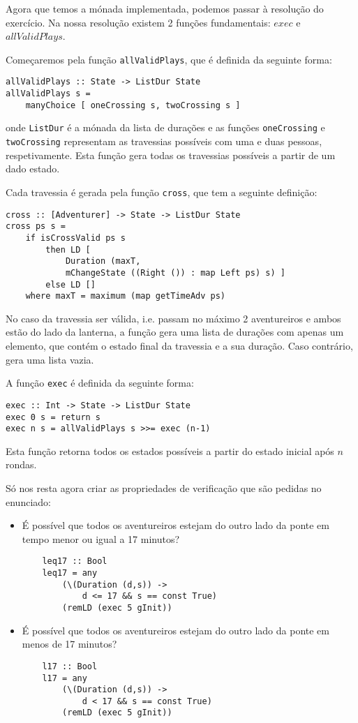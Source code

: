 \documentclass[12pt]{extarticle}
\begin{document}
Agora que temos a mónada implementada, podemos passar à resolução do exercício.
Na nossa resolução existem 2 funções fundamentais: $exec$ e $allValidPlays$.

Começaremos pela função \texttt{allValidPlays}, que é definida da seguinte forma:
\begin{lstlisting}
allValidPlays :: State -> ListDur State
allValidPlays s = 
    manyChoice [ oneCrossing s, twoCrossing s ]
\end{lstlisting}

onde \texttt{ListDur} é a mónada da lista de durações e as funções \texttt{oneCrossing} e \texttt{twoCrossing} representam as travessias possíveis com uma e duas pessoas, respetivamente.
Esta função gera todas os travessias possíveis a partir de um dado estado.

Cada travessia é gerada pela função \texttt{cross}, que tem a seguinte definição:
\begin{lstlisting}
cross :: [Adventurer] -> State -> ListDur State
cross ps s = 
    if isCrossValid ps s 
        then LD [ 
            Duration (maxT, 
            mChangeState ((Right ()) : map Left ps) s) ]
        else LD []
    where maxT = maximum (map getTimeAdv ps)
\end{lstlisting}
No caso da travessia ser válida, i.e. passam no máximo 2 aventureiros e ambos estão do lado da lanterna, a função gera uma lista de durações com apenas um elemento, que contém o estado final da travessia e a sua duração.
Caso contrário, gera uma lista vazia.


A função \texttt{exec} é definida da seguinte forma:
\begin{lstlisting}
exec :: Int -> State -> ListDur State
exec 0 s = return s
exec n s = allValidPlays s >>= exec (n-1)
\end{lstlisting}

Esta função retorna todos os estados possíveis a partir do estado inicial após $n$ rondas.

Só nos resta agora criar as propriedades de verificação que são pedidas no enunciado:
\begin{itemize}
    \item É possível que todos os aventureiros estejam do outro lado da ponte em tempo menor ou igual a 17 minutos?
    \begin{lstlisting}
    leq17 :: Bool
    leq17 = any 
        (\(Duration (d,s)) -> 
            d <= 17 && s == const True) 
        (remLD (exec 5 gInit))
    \end{lstlisting}

    \item É possível que todos os aventureiros estejam do outro lado da ponte em menos de 17 minutos?
    \begin{lstlisting}
    l17 :: Bool
    l17 = any 
        (\(Duration (d,s)) -> 
            d < 17 && s == const True) 
        (remLD (exec 5 gInit))
    \end{lstlisting}
\end{itemize}
\end{document}
